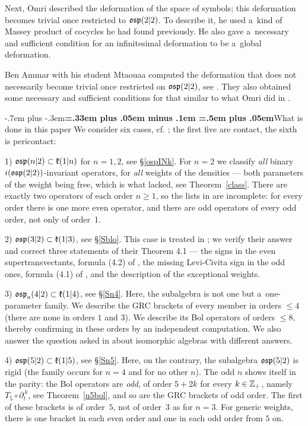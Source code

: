 \documentclass[12pt,a4paper]{amsart}
\makeatletter
\providecommand{\headspaces}{\spaceskip=.33em plus .05em minus .1em \xspaceskip=.5em plus .05em}
\def\subsection{\@startsection{subsection}{2}{0pt}{-1ex \@plus -.4ex \@minus -.2ex}%
  {-.7em plus -.3em}{\normalfont\normalsize\bfseries\boldmath\headspaces}}
\theoremstyle{thm}
\theoremstyle{definition}
\let\ssec\subsection
\makeatother
\begin{document}
Next, Omri  described the deformation of the space of symbols; this deformation becomes trivial once restricted to ${\mathfrak{osp}}(2|2)$. To describe it, he used a~kind of Massey product of cocycles he had found previously. He also gave a~necessary and sufficient condition for an infinitesimal deformation to be a~global deformation.

Ben Ammar with his student Mtaouaa  computed the deformation that does not necessarily become trivial once restricted on ${\mathfrak{osp}}(2|2)$, see \cite{BeM}. They also obtained some necessary and sufficient conditions for that similar to what Omri did in \cite{Om}.


\ssec{What is done in this paper}\label{whatwedo}
We consider six cases, cf. \cite[Table~(4)]{BLS1}\textup{;} the first five are contact, the sixth is pericontact:

1) ${\mathfrak{osp}}(n|2)\subset{\mathfrak{k}}(1|n)$ for $n=1,2$, see \S\ref{ospINk}. For $n=2$ we classify
\textit{all} binary $i({\mathfrak{osp}}(2|2))$-invariant operators, for \textit{all} weights of the
densities --- both parameters of the weight being free, which is what \cite{Om} lacked, see
Theorem~\ref{class}. There are exactly two operators of each order $n\geq1$, so the lists in
\cite{GO, Om} are incomplete: for every order there is one more even operator, and there are
odd operators of every odd order, not only of order~1.

2) ${\mathfrak{osp}}(3|2)\subset{\mathfrak{k}}(1|3)$, see \S\ref{Sblo}. This case is treated in \cite{BLO}; we
verify their answer and correct three statements of their Theorem 4.1 --- the signs in the
even supertransvectants, formula (4.2) of \cite{BLO}, the missing Levi-Civita sign in the odd ones, formula (4.1) of \cite{BLO}, and the
description of the exceptional weights.

3) ${\mathfrak{osp}}_a(4|2)\subset{\mathfrak{k}}(1|4)$, see \S\ref{Sn4}. Here, the subalgebra is not one but
a~one-parameter family. We describe the GRC brackets of every member in orders $\leq4$ (there are none in orders $1$ and $3$). We describe its Bol operators of orders $\leq8$, thereby confirming \cite[Thm~1.6]{BLS1} in these orders by an
independent computation. We also answer the question asked in \cite[\S3.2.3a]{BLS1} about
isomorphic algebras with different answers.

4) ${\mathfrak{osp}}(5|2)\subset{\mathfrak{k}}(1|5)$, see \S\ref{Sn5}. Here, on the contrary, the subalgebra ${\mathfrak{osp}}(5|2)$ is
rigid (the family occurs for $n=4$ and for no other $n$). The odd $n$ shows itself in
the parity: the Bol operators are \textit{odd}, of order $5+2k$ for every $k\in{\mathbb Z}_+$, namely $T_5\circ\partial_t^{\,k}$, see Theorem~\ref{n5bol}, and so are the GRC brackets of
odd order. The first of these brackets is of order~$5$, not of order~$3$ as for $n=3$. For generic
weights, there is one bracket in each even order and one in each odd order from $5$ on.
\end{document}

